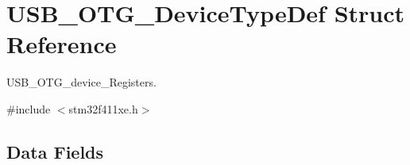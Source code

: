 \hypertarget{struct_u_s_b___o_t_g___device_type_def}{}\section{U\+S\+B\+\_\+\+O\+T\+G\+\_\+\+Device\+Type\+Def Struct Reference}
\label{struct_u_s_b___o_t_g___device_type_def}


U\+S\+B\+\_\+\+O\+T\+G\+\_\+device\+\_\+\+Registers.  




{\ttfamily \#include $<$stm32f411xe.\+h$>$}

\subsection*{Data Fields}
